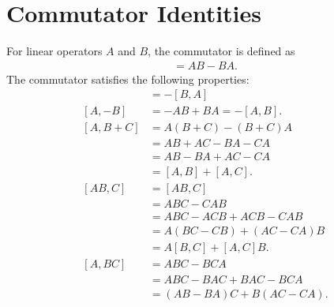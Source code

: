 \section{Commutator Identities}
For linear operators $A$ and $B$, the commutator is defined as
\begin{align}
    [A,B] = AB - BA.
\end{align}
The commutator satisfies the following properties:
\begin{align}
    [A,B] &= -[B,A] \label{eq:BA} \\
    [A,-B] &= -AB + BA = -[A,B].\label{eq:AmB} \\
    [A,B+C] 
        &= A(B+C) - (B+C)A \nonumber\\
        &= AB + AC - BA - CA \nonumber\\
        &= AB - BA + AC - CA \nonumber\\
        &= [A,B] + [A,C]. \label{eq:ABpC} \\
    [AB,C] 
        &= [AB,C] \nonumber\\
        &= ABC - CAB \nonumber\\
        &= ABC - ACB + ACB - CAB \nonumber\\
        &= A(BC-CB) + (AC-CA)B \nonumber\\
        &= A[B,C] + [A,C]B.\label{eq:A2B}\\
    [A,BC]
        &= ABC - BCA \nonumber\\
        &= ABC - BAC + BAC - BCA \nonumber\\
        &= (AB - BA)C + B(AC - CA).\label{eq:ABC}
\end{align}

